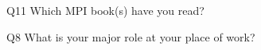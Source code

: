 \begin{description}%
\item{Q11} Which MPI book(s) have you read?%
\item{Q8} What is your major role at your place of work?%
\end{description}%
